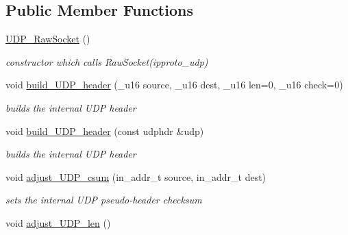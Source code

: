 \subsection*{Public Member Functions}
\begin{CompactItemize}
\item 
\hypertarget{classsocketpp_1_1UDP__RawSocket_508aba470eee4010ca16007823c91650}{
\hyperlink{classsocketpp_1_1UDP__RawSocket_508aba470eee4010ca16007823c91650}{UDP\_\-RawSocket} ()}
\label{classsocketpp_1_1UDP__RawSocket_508aba470eee4010ca16007823c91650}

\begin{CompactList}\small\item\em constructor which calls RawSocket(ipproto\_\-udp) \item\end{CompactList}\item 
void \hyperlink{classsocketpp_1_1UDP__RawSocket_1b055bafc0e178db6a3940093dc0f8e0}{build\_\-UDP\_\-header} (\_\-u16 source, \_\-u16 dest, \_\-u16 len=0, \_\-u16 check=0)
\begin{CompactList}\small\item\em builds the internal UDP header \item\end{CompactList}\item 
void \hyperlink{classsocketpp_1_1UDP__RawSocket_b194e3ab2f5b758dee8a0c715d895c1e}{build\_\-UDP\_\-header} (const udphdr \&udp)
\begin{CompactList}\small\item\em builds the internal UDP header \item\end{CompactList}\item 
void \hyperlink{classsocketpp_1_1UDP__RawSocket_8d96a58ee9d39e2c014aa81ded23727a}{adjust\_\-UDP\_\-csum} (in\_\-addr\_\-t source, in\_\-addr\_\-t dest)
\begin{CompactList}\small\item\em sets the internal UDP pseudo-header checksum \item\end{CompactList}\item 
\hypertarget{classsocketpp_1_1UDP__RawSocket_1caa413cfe4f72d8c0aeccdcb10469b5}{
void \hyperlink{classsocketpp_1_1UDP__RawSocket_1caa413cfe4f72d8c0aeccdcb10469b5}{adjust\_\-UDP\_\-len} ()}
\label{classsocketpp_1_1UDP__RawSocket_1caa413cfe4f72d8c0aeccdcb10469b5}


\end{CompactItemize}
